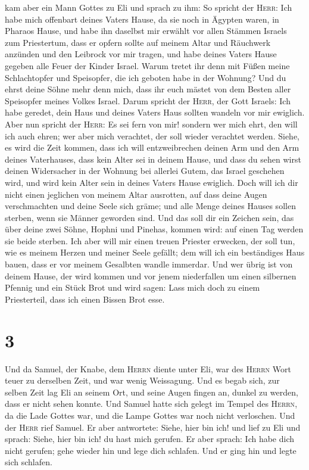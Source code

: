kam aber ein Mann Gottes zu Eli und sprach zu ihm: So spricht der
\textsc{Herr}: Ich habe mich offenbart deines Vaters Hause, da sie noch
in Ägypten waren, in Pharaos Hause,  und habe ihn
daselbst mir erwählt vor allen Stämmen Israels zum Priestertum, dass er
opfern sollte auf meinem Altar und Räuchwerk anzünden und den Leibrock
vor mir tragen, und habe deines Vaters Hause gegeben alle Feuer der
Kinder Israel.  Warum tretet ihr denn mit Füßen meine
Schlachtopfer und Speisopfer, die ich geboten habe in der Wohnung? Und
du ehrst deine Söhne mehr denn mich, dass ihr euch mästet von dem Besten
aller Speisopfer meines Volkes Israel.  Darum spricht der
\textsc{Herr}, der Gott Israels: Ich habe geredet, dein Haus und deines
Vaters Haus sollten wandeln vor mir ewiglich. Aber nun spricht der
\textsc{Herr}: Es sei fern von mir! sondern wer mich ehrt, den will ich
auch ehren; wer aber mich verachtet, der soll wieder verachtet werden.
 Siehe, es wird die Zeit kommen, dass ich will
entzweibrechen deinen Arm und den Arm deines Vaterhauses, dass kein
Alter sei in deinem Hause,  und dass du sehen wirst
deinen Widersacher in der Wohnung bei allerlei Gutem, das Israel
geschehen wird, und wird kein Alter sein in deines Vaters Hause
ewiglich.  Doch will ich dir nicht einen jeglichen von
meinem Altar ausrotten, auf dass deine Augen verschmachten und deine
Seele sich gräme; und alle Menge deines Hauses sollen sterben, wenn sie
Männer geworden sind.  Und das soll dir ein Zeichen sein,
das über deine zwei Söhne, Hophni und Pinehas, kommen wird: auf einen
Tag werden sie beide sterben.  Ich aber will mir einen
treuen Priester erwecken, der soll tun, wie es meinem Herzen und meiner
Seele gefällt; dem will ich ein beständiges Haus bauen, dass er vor
meinem Gesalbten wandle immerdar.  Und wer übrig ist von
deinem Hause, der wird kommen und vor jenem niederfallen um einen
silbernen Pfennig und ein Stück Brot und wird sagen: Lass mich doch zu
einem Priesterteil, dass ich einen Bissen Brot esse.

\hypertarget{section-2}{%
\section{3}\label{section-2}}

 Und da Samuel, der Knabe, dem \textsc{Herrn} diente unter
Eli, war des \textsc{Herrn} Wort teuer zu derselben Zeit, und war wenig
Weissagung.  Und es begab sich, zur selben Zeit lag Eli an
seinem Ort, und seine Augen fingen an, dunkel zu werden, dass er nicht
sehen konnte.  Und Samuel hatte sich gelegt im Tempel des
\textsc{Herrn}, da die Lade Gottes war, und die Lampe Gottes war noch
nicht verloschen.  Und der \textsc{Herr} rief Samuel. Er
aber antwortete: Siehe, hier bin ich!  und lief zu Eli und
sprach: Siehe, hier bin ich! du hast mich gerufen. Er aber sprach: Ich
habe dich nicht gerufen; gehe wieder hin und lege dich schlafen. Und er
ging hin und legte sich schlafen.

